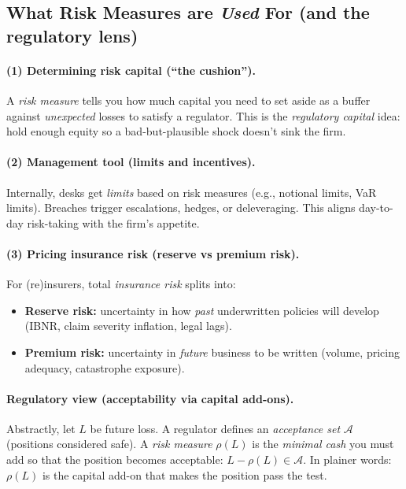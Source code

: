 \subsection*{What Risk Measures are \emph{Used} For (and the regulatory lens)}

\paragraph{(1) Determining risk capital (``the cushion'').}
A \emph{risk measure} tells you how much capital you need to set aside as a buffer against \emph{unexpected} losses to satisfy a regulator. This is the \emph{regulatory capital} idea: hold enough equity so a bad-but-plausible shock doesn’t sink the firm.

\paragraph{(2) Management tool (limits and incentives).}
Internally, desks get \emph{limits} based on risk measures (e.g., notional limits, VaR limits). Breaches trigger escalations, hedges, or deleveraging. This aligns day-to-day risk-taking with the firm’s appetite.

\paragraph{(3) Pricing insurance risk (reserve vs premium risk).}
For (re)insurers, total \emph{insurance risk} splits into:
\begin{itemize}
  \item \textbf{Reserve risk:} uncertainty in how \emph{past} underwritten policies will develop (IBNR, claim severity inflation, legal lags).
  \item \textbf{Premium risk:} uncertainty in \emph{future} business to be written (volume, pricing adequacy, catastrophe exposure).
\end{itemize}

\paragraph{Regulatory view (acceptability via capital add-ons).}
Abstractly, let \(L\) be future loss. A regulator defines an \emph{acceptance set} \( \mathcal{A}\) (positions considered safe). A \emph{risk measure} \(\rho(L)\) is the \emph{minimal cash} you must add so that the position becomes acceptable: \(L - \rho(L) \in \mathcal{A}\). In plainer words: \(\rho(L)\) is the capital add-on that makes the position pass the test.

